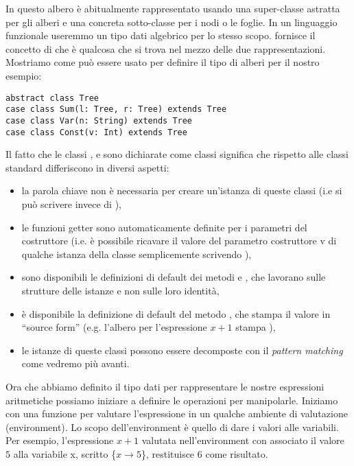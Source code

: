 In \Java questo albero \`e abitualmente rappresentato usando una super-classe astratta per gli alberi e una concreta sotto-classe per i nodi o le foglie. In un linguaggio funzionale useremmo un tipo dati algebrico per lo stesso scopo. \Scala fornisce il concetto di  che \`e qualcosa che si trova nel mezzo delle due rappresentazioni. Mostriamo come pu\`o essere usato per definire il tipo di alberi per il nostro esempio:
\begin{lstlisting}
abstract class Tree
case class Sum(l: Tree, r: Tree) extends Tree
case class Var(n: String) extends Tree
case class Const(v: Int) extends Tree
\end{lstlisting}	
Il fatto che le classi ,  e  sono dichiarate come classi  significa che rispetto alle classi standard differiscono in diversi aspetti:
\begin{itemize}
	\item la parola chiave  non \`e necessaria per creare un'istanza di queste classi (i.e si pu\`o scrivere  invece di ),
	\item le funzioni getter sono automaticamente definite per i parametri del costruttore (i.e. \`e possibile ricavare il valore del parametro costruttore v di qualche istanza  della classe  semplicemente scrivendo ),
	\item sono disponibili le definizioni di default dei metodi  e , che lavorano sulle strutture delle istanze e non sulle loro identit\`a, 
	\item \`e disponibile la definizione di default del metodo , che stampa il valore in ``source form'' (e.g. l'albero per l'espressione $x+1$ stampa \newline {}),
	\item le istanze di queste classi possono essere decomposte con il \emph{pattern matching} come vedremo pi\`u avanti.
\end{itemize}
Ora che abbiamo definito il tipo dati per rappresentare le nostre espressioni aritmetiche possiamo iniziare a definire le operazioni per manipolarle. Iniziamo con una funzione per valutare l'espressione in un qualche ambiente di valutazione (environment). Lo scopo dell'environment \`e quello di dare i valori alle variabili. Per esempio, l'espressione $x+1$ valutata nell'environment con associato il valore $5$ alla variabile x, scritto \{$x\rightarrow 5$\}, restituisce $6$ come risultato.

